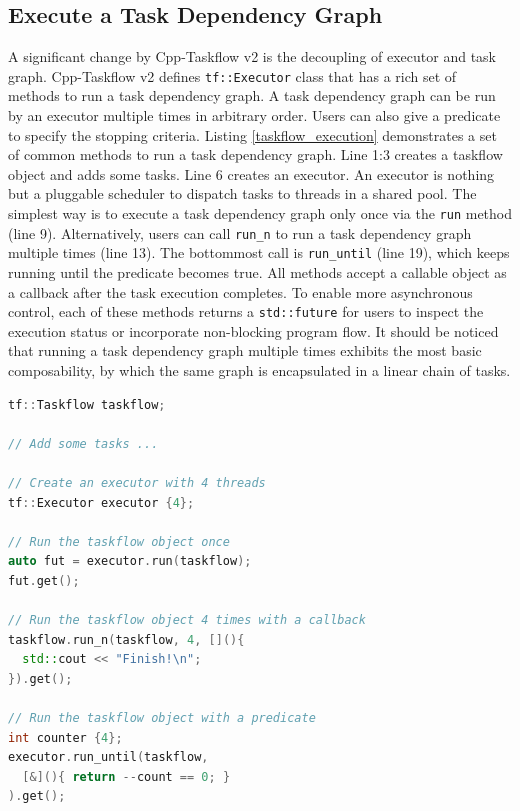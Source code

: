 \documentclass[conference]{IEEEtran}
\begin{document}
\subsection{Execute a Task Dependency Graph}
A significant change by Cpp-Taskflow v2 is the decoupling of executor and task graph.  %
Cpp-Taskflow v2 defines \lstinline{tf::Executor} class that has
a rich set of methods to run a task dependency graph.
A task dependency graph can be run by an executor multiple times in arbitrary order.
Users can also give a predicate to specify the stopping criteria.
Listing \ref{taskflow_execution} demonstrates a set of common methods to run a task dependency graph.
Line 1:3 creates a taskflow object and adds some tasks.
Line 6 creates an executor.
An executor is nothing but a pluggable scheduler to dispatch tasks to threads in a shared pool.
The simplest way is to execute a task dependency graph only once via the
\lstinline{run} method (line 9).  
Alternatively, users can call \lstinline{run_n} to run a task dependency graph multiple times (line 13).
The bottommost call is \lstinline{run_until} (line 19),
which keeps running until the predicate becomes true.
All methods accept a callable object as a callback after the task execution completes.
To enable more asynchronous control,
each of these methods returns a \lstinline{std::future} for users 
to inspect the execution status or incorporate non-blocking program flow.
%
It should be noticed that running a task dependency graph multiple times exhibits 
the most basic composability, by which the same graph is encapsulated in a linear chain of tasks.

\begin{lstlisting}[language=C++,label=taskflow_execution,caption={Different ways to execute a task dependency graph.}]
tf::Taskflow taskflow;

// Add some tasks ...

// Create an executor with 4 threads
tf::Executor executor {4};

// Run the taskflow object once
auto fut = executor.run(taskflow); 
fut.get();

// Run the taskflow object 4 times with a callback
taskflow.run_n(taskflow, 4, [](){
  std::cout << "Finish!\n";
}).get();

// Run the taskflow object with a predicate 
int counter {4};
executor.run_until(taskflow, 
  [&](){ return --count == 0; }
).get();

\end{lstlisting}
\end{document}
